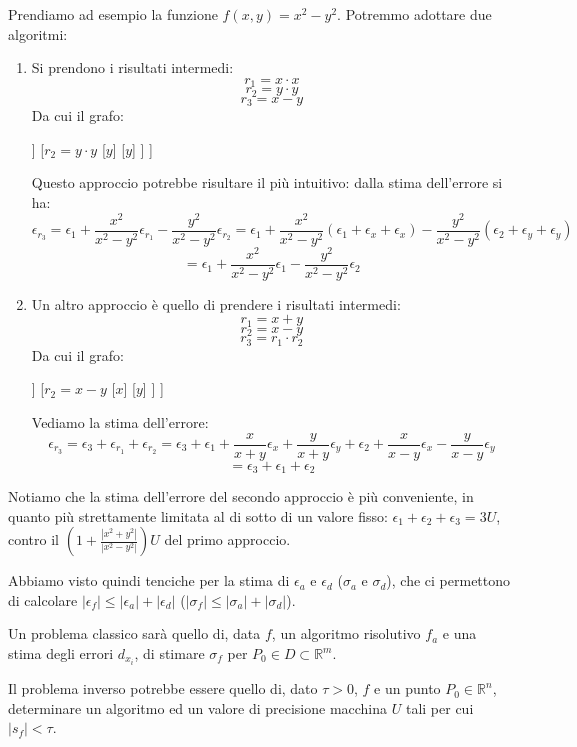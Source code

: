 \documentclass[a4paper,11pt]{article}
\begin{document}
Prendiamo ad esempio la funzione $f(x, y) = x^2 - y^2$.
Potremmo adottare due algoritmi:
\begin{enumerate}
	\item Si prendono i risultati intermedi:
		$$
			r_1 = x \cdot x
		$$
		$$
			r_2 = y \cdot y
		$$
		$$
			r_3 = x - y
		$$
		Da cui il grafo:
		\begin{center}
			\begin{forest}
				[
					{$r_3 = r_1 - r_2$}
					[{$r_1 = x \cdot x$}
						[$x$]
						[$x$]
					]
					[{$r_2 = y \cdot y$}
						[$y$]
						[$y$]
					]
				]	
			\end{forest}
		\end{center}
		Questo approccio potrebbe risultare il più intuitivo: dalla stima dell'errore si ha:
		$$
		\epsilon_{r_3} = \epsilon_1 + \frac{x^2}{x^2 - y^2}\epsilon_{r_1} - \frac{y^2}{x^2 - y^2}\epsilon_{r_2} = \epsilon_1 + \frac{x^2}{x^2 - y^2}(\epsilon_1 + \epsilon_x + \epsilon_x) - \frac{y^2}{x^2 - y^2}(\epsilon_2 + \epsilon_y + \epsilon_y)
		$$
		$$
= \epsilon_1 + \frac{x^2}{x^2 - y^2}\epsilon_1 - \frac{y^2}{x^2 - y^2}\epsilon_2 
		$$
	
	\item Un altro approccio è quello di prendere i risultati intermedi:
		$$
			r_1 = x + y
		$$
		$$
			r_2 = x - y
		$$
		$$
			r_3 = r_1 \cdot r_2
		$$
		Da cui il grafo:
		\begin{center}
			\begin{forest}
				[
					{$r_3 = r_1 \cdot r_2$}
					[{$r_1 = x + y$}
						[$x$]
						[$y$]
					]
					[{$r_2 = x - y$}
						[$x$]
						[$y$]
					]
				]	
			\end{forest}
		\end{center}
		Vediamo la stima dell'errore:
		$$
		\epsilon_{r_3} = \epsilon_3 + \epsilon_{r_1} + \epsilon_{r_2} = \epsilon_3 + \epsilon_1 + \frac{x}{x + y} \epsilon_x + \frac{y}{x + y} \epsilon_y + \epsilon_2 + \frac{x}{x - y} \epsilon_x - \frac{y}{x - y} \epsilon_y 
		$$
		$$
 		= \epsilon_3 + \epsilon_1 + \epsilon_2
		$$
\end{enumerate}
Notiamo che la stima dell'errore del secondo approccio è più conveniente, in quanto più strettamente limitata al di sotto di un valore fisso: $\epsilon_1 + \epsilon_2 + \epsilon_3 = 3U$, contro il $\left( 1 + \frac{|x^2 + y^2|}{|x^2 - y^2|} \right) U$ del primo approccio.

\par\smallskip

Abbiamo visto quindi tenciche per la stima di $\epsilon_a$ e $\epsilon_d$ ($\sigma_a$ e $\sigma_d$), che ci permettono di calcolare $|\epsilon_f| \leq |\epsilon_a| + |\epsilon_d|$ ($|\sigma_f| \leq |\sigma_a| + |\sigma_d|$). 

Un problema classico sarà quello di, data $f$, un algoritmo risolutivo $f_a$ e una stima degli errori $d_{x_i}$, di stimare $\sigma_f$ per $P_0 \in D \subset \mathbb{R}^m$.

Il problema inverso potrebbe essere quello di, dato $\tau > 0$, $f$ e un punto $P_0 \in \mathbb{R}^n$, determinare un algoritmo ed un valore di precisione macchina $U$ tali per cui $|s_f| < \tau$.
\end{document}

